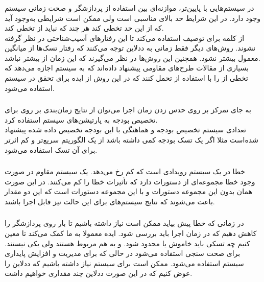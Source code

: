 \documentclass[a4paper, 11pt]{article}
\begin{document}
\subsubsection{}
در سیستم‌هایی با
پایین‌تر، موازنه‌ای بین استفاده از پردازشگر و صحت زمانی سیستم وجود دارد. در این شرایط
حد بالای مناسبی است ولی ممکن است شرایطی به‌وجود آید که از این حد تخطی کند هر چند که نباید از
تخطی کند. \\
از کلمه
برای توصیف استفاده می‌کند تا این رفتار‌های آسیب‌شناختی در نظر گرفته نشوند.
روش‌های دیگر فقط زمانی به ددلاین توجه می‌کنند که رفتار تسک‌ها از میانگین معمول بیشتر نشود.
همچنین این روش‌ها در نظر می‌گیرند که این زمان از
بیشتر نباشد. \\
بسیاری از مقالات طرح‌های مقاومی پیشنهاد داده‌اند که به سیستم اجازه می‌دهد که تخطی از
را با استفاده از
تحمل کنند که در این روش از ایده
برای تحقق
در سیستم استفاده می‌شود.
\subsubsection{}
به جای تمرکز بر روی حدس زدن زمان اجرا می‌توان از نتایج زمان‌بندی بر روی
برای تخصیص بودجه به پارتیشن‌های سیستم استفاده کرد. \\
تعدادی سیستم تخصیص بودجه و هماهنگی با این بودجه تخصیص داده شده پیشنهاد شده‌است
مثلا اگر یک تسک بودجه کمی داشته باشد از یک الگوریتم سریع‌تر و کم اثر‌تر برای آن تسک استفاده
می‌شود.
\subsubsection{}
خطا در یک سیستم رویدادی است که کم رخ می‌دهد. یک سیستم مقاوم در صورت وجود خطا مجموعه‌ای
از دستورات دارد که تأثیرات خطا را کم می‌کنند. در این صورت
همان
بدون این مجموعه دستورات و
با این مجموعه دستورات است که این دو مقدار باعث می‌شوند که نتایج سیستم‌های
برای این حالت نیز قابل اجرا باشند.
\subsubsection{}
در زمانی که خطا پیش بیاید ممکن است نیاز داشته باشیم تا بار روی پردازشگر را کاهش دهیم
که در زمان اجرا باید بررسی شود. ایده
معمولا به ما کمک می‌کند تا معین کنیم چه تسکی باید خاموش یا محدود شود.
و
به هم مربوط هستند ولی یکی نیستند.
برای صحت سنجی استفاده می‌شود در حالی که
برای مدیریت و افزایش پایداری سیستم استفاده می‌شود. ممکن است برای سیستم نیاز داشته باشیم
که ددلاین را عوض کنیم که در این صورت ددلاین چند مقداری خواهیم داشت.
\end{document}
